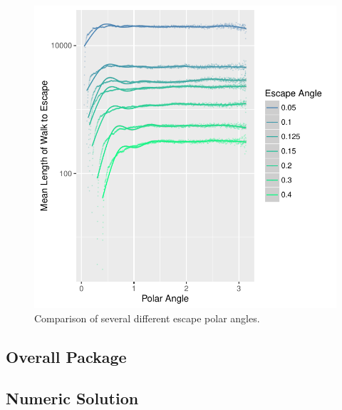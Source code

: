 \documentclass{article}
\begin{document}
		\begin{figure}[h]
			\centering
			\includegraphics{images/SummaryPlot_L005_04.pdf}
			\caption{Comparison of several different escape polar angles.}
		\end{figure}
	\subsection{Overall Package}
	\subsection{Numeric Solution} \label{NumericSoln}
	


\end{document}
